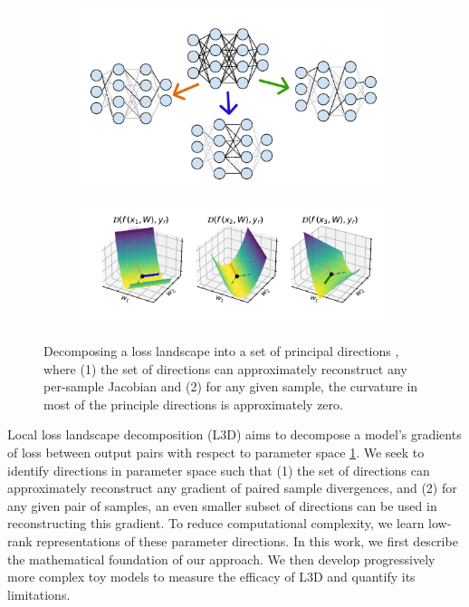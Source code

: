 \documentclass{article}
\theoremstyle{plain}
\theoremstyle{definition}
\theoremstyle{remark}
\begin{document}
\begin{figure}
    \begin{subfigure}{\columnwidth}
        \centering
        \includegraphics[width=.7\textwidth]{../figures/1b_jacobian_diagram.pdf}
    \end{subfigure}
    \begin{subfigure}{\columnwidth}
        \centering
        \includegraphics[width=\textwidth]{../figures/1a_jacobian_diagram.pdf}
    \end{subfigure} \caption{Decomposing a loss landscape into a set of principal directions , where (1) the set of directions can approximately reconstruct any per-sample Jacobian and (2) for any given sample, the curvature in most of the principle directions is approximately zero.}\label{fig:1_jacobian_diagram}
    
\end{figure}


Local loss landscape decomposition (L3D) aims to decompose a model's gradients of loss between output pairs with respect to parameter space \ref{fig:1_jacobian_diagram}. We seek to identify directions in parameter space such that (1) the set of directions can approximately reconstruct any gradient of paired sample divergences, and (2) for any given pair of samples, an even smaller subset of directions can be used in reconstructing this gradient. To reduce computational complexity, we learn low-rank representations of these parameter directions. In this work, we first describe the mathematical foundation of our approach. We then develop progressively more complex toy models to measure the efficacy of L3D and quantify its limitations. %
\end{document}
